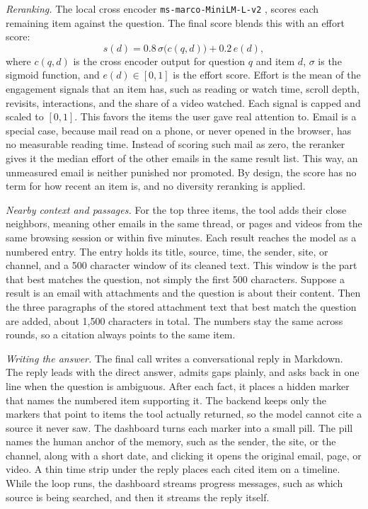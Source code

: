 \documentclass[conference]{IEEEtran}
\newcommand{\rerankmodel}{\texttt{ms\allowbreak-marco\allowbreak-MiniLM\allowbreak-L\allowbreak-6\allowbreak-v2}}
\begin{document}
\textit{Reranking.} The local cross encoder \rerankmodel{} \cite{b10}, \cite{b11} scores each remaining item against the question. The final score blends this with an effort score:
\begin{equation}
s(d) = 0.8\,\sigma\big(c(q,d)\big) + 0.2\,e(d), \label{eq:final}
\end{equation}
where $c(q,d)$ is the cross encoder output for question $q$ and item $d$, $\sigma$ is the sigmoid function, and $e(d) \in [0,1]$ is the effort score. Effort is the mean of the engagement signals that an item has, such as reading or watch time, scroll depth, revisits, interactions, and the share of a video watched. Each signal is capped and scaled to $[0,1]$. This favors the items the user gave real attention to. Email is a special case, because mail read on a phone, or never opened in the browser, has no measurable reading time. Instead of scoring such mail as zero, the reranker gives it the median effort of the other emails in the same result list. This way, an unmeasured email is neither punished nor promoted. By design, the score has no term for how recent an item is, and no diversity reranking is applied.

\textit{Nearby context and passages.} For the top three items, the tool adds their close neighbors, meaning other emails in the same thread, or pages and videos from the same browsing session or within five minutes. Each result reaches the model as a numbered entry. The entry holds its title, source, time, the sender, site, or channel, and a 500 character window of its cleaned text. This window is the part that best matches the question, not simply the first 500 characters. Suppose a result is an email with attachments and the question is about their content. Then the three paragraphs of the stored attachment text that best match the question are added, about 1,500 characters in total. The numbers stay the same across rounds, so a citation always points to the same item.

\textit{Writing the answer.} The final call writes a conversational reply in Markdown. The reply leads with the direct answer, admits gaps plainly, and asks back in one line when the question is ambiguous. After each fact, it places a hidden marker that names the numbered item supporting it. The backend keeps only the markers that point to items the tool actually returned, so the model cannot cite a source it never saw. The dashboard turns each marker into a small pill. The pill names the human anchor of the memory, such as the sender, the site, or the channel, along with a short date, and clicking it opens the original email, page, or video. A thin time strip under the reply places each cited item on a timeline. While the loop runs, the dashboard streams progress messages, such as which source is being searched, and then it streams the reply itself.
\end{document}

